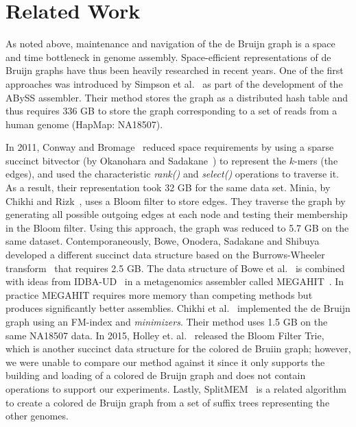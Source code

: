 \section{Related Work} As noted above, maintenance and navigation of the de Bruijn graph is a space and time bottleneck in genome assembly. Space-efficient representations of de Bruijn graphs have thus been heavily researched in recent years. One of the first approaches was introduced by Simpson et al.~\cite{Simpson:2009} as part of the development of the ABySS assembler.  Their method stores the graph as a distributed hash table and thus requires 336 GB to store the graph corresponding to a set of reads from a human genome (HapMap: NA18507). 
 
 In 2011, Conway and Bromage~\cite{conway} reduced space requirements  by using a sparse succinct bitvector (by Okanohara and Sadakane~\cite{bitvector}) to represent the $k$-mers (the edges), and used the characteristic \emph{rank()} and \emph{select()} operations to traverse it. As a result, their representation took 32 GB for the same data set.  Minia, by Chikhi and Rizk~\cite{wabi}, uses a Bloom filter to store edges. They traverse the graph by generating all possible outgoing edges at each node and testing their membership in the Bloom filter. Using this approach, the graph was reduced to 5.7 GB on the same dataset.  Contemporaneously, Bowe, Onodera, Sadakane and Shibuya~\cite{BOSS12} developed a different succinct data structure based on the Burrows-Wheeler transform~\cite{BW94} that requires 2.5 GB.  The data structure of Bowe et al.~\cite{BOSS12} is combined with ideas from IDBA-UD~\cite{idbaud} in a metagenomics assembler called MEGAHIT~\cite{megahit}.  In practice MEGAHIT requires more memory than competing methods  but produces significantly better assemblies.   Chikhi {et al.}~\cite{paul} implemented the de Bruijn graph using an FM-index and {\em minimizers}.   Their method uses 1.5 GB on the same NA18507 data.  In 2015, Holley et. al.~\cite{BFT} released the Bloom Filter Trie, which is another succinct data structure for the colored de Bruiin graph; however, we were unable to compare our method against it since  it only supports the building and loading of a colored de Bruijn graph and does not contain operations to support our experiments.  Lastly, SplitMEM~\cite{splitmem} is a related algorithm to create a colored de Bruijn graph from a set of suffix trees representing the other genomes. 



